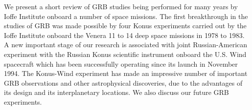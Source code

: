 


\bigskip



\bigskip

\noindent We present a short review of GRB studies being performed for many years by Ioffe Institute onboard a number of space missions. The first breakthrough in the studies of GRB was made possible by four Konus experiments carried out by the Ioffe Institute onboard the Venera 11 to 14 deep space missions in 1978 to 1983. A new important stage of our research  is associated with joint Russian-American experiment with the Russian Konus scientific instrument onboard the U.S. Wind spacecraft which has been successfully operating since its launch in November 1994. The Konus-Wind experiment has made an impressive number of important GRB observations and other astrophysical discoveries, due to the advantages of its design and its interplanetary locations. We also discuss our future GRB experiments.

